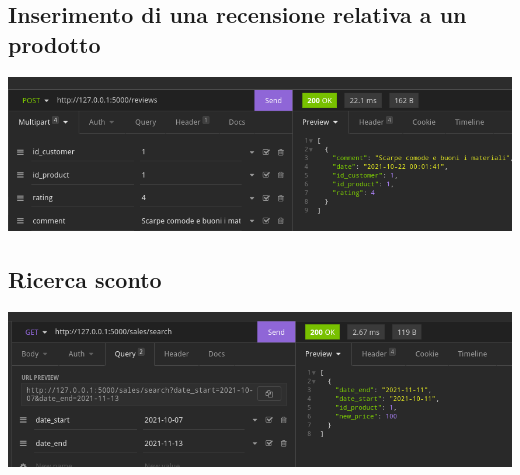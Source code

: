 \subsection{Inserimento di una recensione relativa a un prodotto}

\includegraphics[scale=0.45]{images/recensione.png}

\subsection{Ricerca sconto}

\includegraphics[scale=0.45]{images/ricerca_sconti.png}